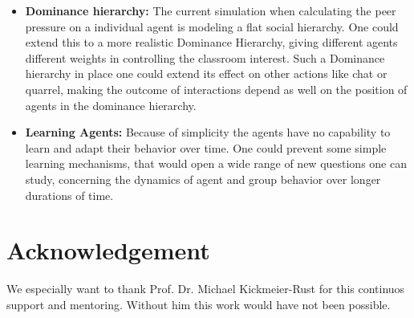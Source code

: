 \begin{itemize}
    \item \textbf{Dominance hierarchy:} The current simulation when calculating
    the peer pressure on a individual agent is modeling a flat social hierarchy.
    One could extend this to a more realistic Dominance Hierarchy, giving different
    agents different weights in controlling the classroom interest. Such a Dominance
    hierarchy in place one could extend its effect on other actions like chat or
    quarrel, making the outcome of interactions depend as well on the position
    of agents in the dominance hierarchy.

    \item \textbf{Learning Agents:} Because of simplicity the agents have no capability
    to learn and adapt their behavior over time. One could prevent some simple learning
    mechanisms, that would open a wide range of new questions one can study, concerning
    the dynamics of agent and group behavior over longer durations of time.
\end{itemize}

\section{Acknowledgement}
We especially want to thank Prof. Dr. Michael Kickmeier-Rust for this continuos
support and mentoring. Without him this work would have not been possible.
